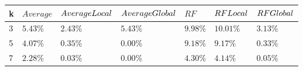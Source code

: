 \documentclass[12pt,a4paper,twoside]{scrartcl}
\numberwithin{equation}{section}
\begin{document}
\begin{table}[H]
\begin{center}
    \begin{tabular}{|l|l|l|l|l|l|p{2cm}|}
\hline 

    k &$Average$&$Average\-Local$&$Average\-Global$ &$RF$& $RF\-Local$& $RF\-Global$ \\ \hline      
    3 &$5.43\%$&$2.43\%$&$5.43\%$&$9.98\%$&$10.01\%$&$3.13\%$\\ \hline
    5& $4.07\%$&$0.35\%$&$0.00\%$&$9.18\%$&$9.17\%$&$0.33\%$\\ \hline
    7&$2.28\%$&$0.03\%$&$0.00\%$&$4.30\%$&$4.14\%$&$0.05\%$\\ \hline
\end{tabular}
\end{center}
\end{table}
  
\end{document}
